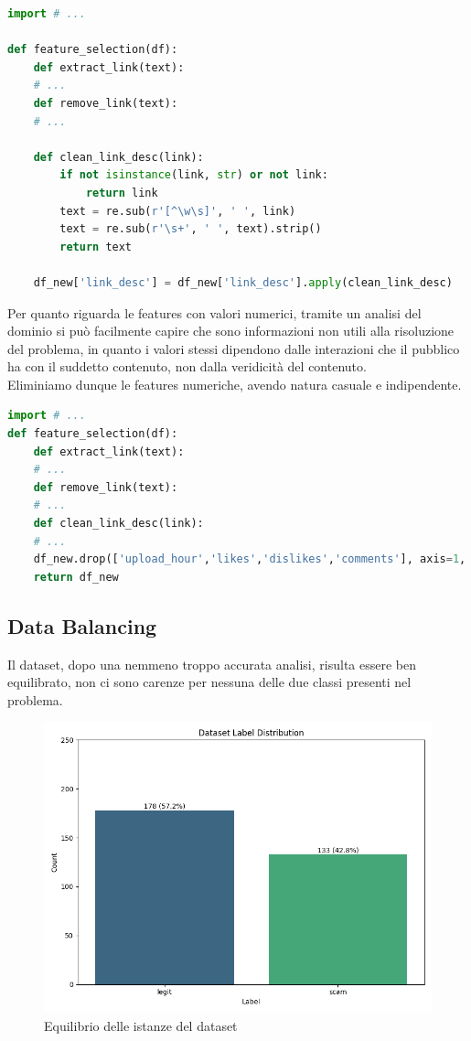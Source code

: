 \documentclass[a4paper,12pt]{report}
\begin{document}
\hfill \break
\begin{lstlisting}[language=Python]
import # ...

def feature_selection(df):
    def extract_link(text):
    # ...
    def remove_link(text):
    # ...
    
    def clean_link_desc(link):
        if not isinstance(link, str) or not link:
            return link
        text = re.sub(r'[^\w\s]', ' ', link)
        text = re.sub(r'\s+', ' ', text).strip()
        return text

    df_new['link_desc'] = df_new['link_desc'].apply(clean_link_desc)
\end{lstlisting}
Per quanto riguarda le features con valori numerici, tramite un analisi del dominio si può facilmente capire che sono informazioni non utili alla risoluzione del problema, in quanto i valori stessi dipendono dalle interazioni che il pubblico ha con il suddetto contenuto, non dalla veridicità del contenuto.\\
Eliminiamo dunque le features numeriche, avendo natura casuale e indipendente.
\begin{lstlisting}[language=Python]
import # ...
def feature_selection(df):
    def extract_link(text):
    # ...
    def remove_link(text):
    # ...
    def clean_link_desc(link):
    # ...
    df_new.drop(['upload_hour','likes','dislikes','comments'], axis=1, inplace=True)
    return df_new
\end{lstlisting}
\newpage
\subsection{Data Balancing}
Il dataset, dopo una nemmeno troppo accurata analisi, risulta essere ben equilibrato, non ci sono carenze per nessuna delle due classi presenti nel problema.
\hfill \break
\begin{figure}[h]
\centering
\includegraphics[width=\textwidth]{data_balancing.png}
\caption{Equilibrio delle istanze del dataset}
\end{figure}
\end{document}
